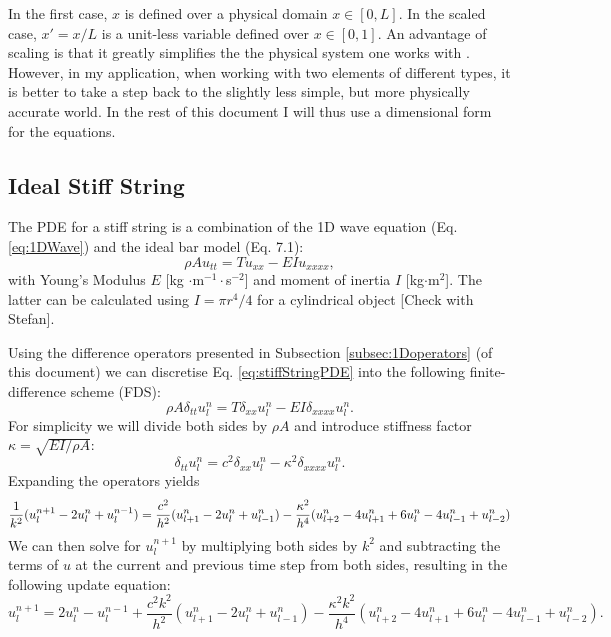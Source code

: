 \documentclass{article}
\begin{document}
In the first case, $x$ is defined over a physical domain $x\in[0,L]$. In the scaled case, $x' = x/L$ is a unit-less variable defined over $x\in[0,1]$. An advantage of scaling is that it greatly simplifies the the physical system one works with \cite{Bilbao2009}. However, in my application, when working with two  elements of different types, it is better to take a step back to the slightly less simple, but more physically accurate world. In the rest of this document I will thus use a dimensional form for the equations.

\subsection{Ideal Stiff String}
The PDE for a stiff string is a combination of the 1D wave equation (Eq. \eqref{eq:1DWave}) and the ideal bar model (Eq. 7.1):
\begin{equation}\label{eq:stiffStringPDE}
    \rho A u_{tt} = T u_{xx} - EI u_{xxxx},
\end{equation}
with Young's Modulus $E$ [kg $\cdot$m$^{-1} \cdot$s$^{-2}$] and moment of inertia $I$ [kg$\cdot$m$^2$]. The latter can be calculated using $I = \pi r^4/4$ for a cylindrical object [Check with Stefan].

Using the difference operators presented in Subsection \ref{subsec:1Doperators} (of this document) we can discretise Eq. \eqref{eq:stiffStringPDE} into the following finite-difference scheme (FDS):
\begin{equation}\label{eq:stiffStringFDS}
    \rho A \delta_{tt}u_l^n = T \delta_{xx} u_l^n - EI \delta_{xxxx} u_l^n.
\end{equation}
For simplicity we will divide both sides by $\rho A$ and introduce stiffness factor $\kappa = \sqrt{EI/\rho A}$:
\begin{equation}\label{eq:stiffStringFDSVars}
   \delta_{tt}u_l^n = c^2 \delta_{xx} u_l^n - \kappa^2 \delta_{xxxx} u_l^n.
\end{equation}
Expanding the operators yields
\begin{equation}
    \frac{1}{k^2}(u_l^{n+1}-2u_l^n+u_l^{n-1}) = \frac{c^2}{h^2}(u_{l+1}^n-2u_l^n+u_{l-1}^n)- \\
 \frac{\kappa^2}{h^4}(u_{l+2}^n-4u_{l+1}^n+6u_l^n-4u_{l-1}^n+u_{l-2}^n)
\end{equation}
We can then solve for $u_l^{n+1}$ by multiplying both sides by $k^2$ and subtracting the terms of $u$ at the current and previous time step from both sides, resulting in the following update equation:
\begin{equation}
    u_l^{n+1} = 2u_l^n-u_l^{n-1}+\frac{c^2k^2}{h^2}(u_{l+1}^n-2u_l^n+u_{l-1}^n)-\frac{\kappa^2k^2}{h^4}(u_{l+2}^n-4u_{l+1}^n+6u_l^n-4u_{l-1}^n+u_{l-2}^n).
\end{equation}
\end{document}
